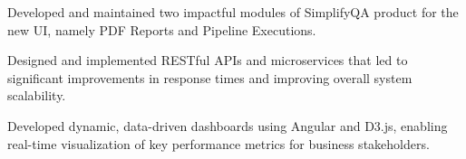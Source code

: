 \documentclass[../main.tex]{subfiles}
\begin{document}
\begin{tightemize}
\item Developed and maintained two impactful modules of SimplifyQA
  product for the new UI, namely PDF Reports and Pipeline Executions.
\item Designed and implemented RESTful APIs and microservices that
  led to significant improvements in response times and improving
  overall system scalability.
\item Developed dynamic, data-driven dashboards using Angular and
  D3.js, enabling real-time visualization of key performance
  metrics for business stakeholders.
\end{tightemize}
\end{document}
